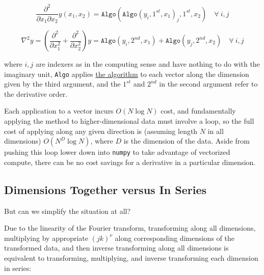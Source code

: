 \documentclass[10pt]{article}
\begin{document}
$$\frac{\partial^2}{\partial x_1 \partial x_2} y(x_1, x_2) = \texttt{Algo}(\texttt{Algo}(y_i, 1^{st}, x_1)_j, 1^{st}, x_2) \quad \forall\ i, j$$

$$ \nabla^2 y = (\frac{\partial^2}{\partial x_1^2} + \frac{\partial^2}{\partial x_2^2}) y = \texttt{Algo}(y_i, 2^{nd}, x_1) + \texttt{Algo}(y_j, 2^{nd}, x_2) \quad \forall\ i, j$$

where $i, j$ are indexers as in the computing sense and have nothing to do with the imaginary unit, \texttt{Algo} applies \hyperref[algo]{the algorithm} to each vector along the dimension given by the third argument, and the $1^{st}$ and $2^{nd}$ in the second argument refer to the derivative order.

Each application to a vector incurs $O(N \log N)$ cost, and fundamentally applying the method to higher-dimensional data must involve a loop, so the full cost of applying along any given direction is (assuming length $N$ in all dimensions) $O(N^D \log N)$, where $D$ is the dimension of the data. Aside from pushing this loop lower down into \texttt{numpy} to take advantage of vectorized compute, there can be no cost savings for a derivative in a particular dimension.

\subsection{Dimensions Together versus In Series}

But can we simplify the situation at all?

Due to the linearity of the Fourier transform, transforming along all dimensions, multiplying by appropriate $(jk)^\nu$ along corresponding dimensions of the transformed data, and then inverse transforming along all dimensions is equivalent to transforming, multiplying, and inverse transforming each dimension in series\cite{johnson}:
\end{document}
